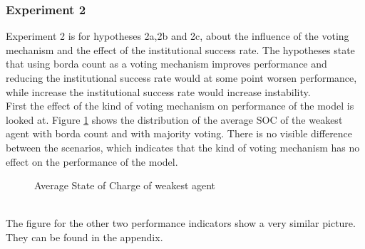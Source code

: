 \documentclass[a4paper]{article}
\begin{document}
\subsubsection{Experiment 2}
Experiment 2 is for hypotheses 2a,2b and 2c, about the influence of the voting mechanism and the effect of the institutional success 
rate. The hypotheses state that using borda count as a voting mechanism improves performance and reducing the institutional success 
rate would at some point worsen performance, while increase the institutional success rate would increase instability.\\
First the effect of the kind of voting mechanism on performance of the model is looked at.
Figure \ref{b_average} shows the distribution of the average SOC of the weakest agent with borda count and with majority 
voting. There is no visible difference between the scenarios, which indicates that the kind of voting mechanism has no 
effect on the performance of the model. \\ 
\begin{figure}[!ht]
\caption{Average State of Charge of weakest agent}
\label{b_average}
\end{figure}\\
The figure for the other two performance indicators show a very similar picture. They can be found in the appendix.\\
\end{document}
